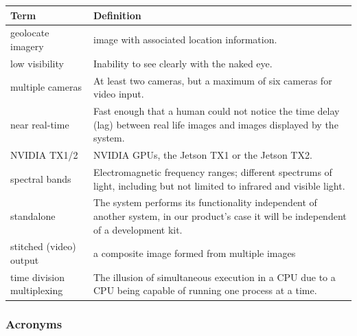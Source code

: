 \documentclass[letterpaper,10pt,serif,draftclsnofoot,onecolumn,compsoc,titlepage]{IEEEtran}
\begin{document}
\begin{tabular}{|l|p{11cm}|}
	\hline
	\textbf{Term} & \textbf{Definition}\\
	\hline
	geolocate imagery & image with associated location information.\\
	\hline
	low visibility & Inability to see clearly with the naked eye.\\
	\hline	
	multiple cameras & At least two cameras, but a maximum of six cameras for 
	video input.\\
	\hline
	near real-time & Fast enough that a human could not notice the time 
	delay (lag) between \newline real life images and images displayed by the system.\\
	\hline
	NVIDIA TX1/2 & NVIDIA GPUs, the Jetson TX1 or the Jetson TX2.\\
	\hline
	spectral bands & Electromagnetic frequency ranges; different 
	spectrums of light, including \newline but not limited to infrared 
	and visible light.\\
	\hline
	standalone & The system performs its functionality independent of another
	system, in our product's case it will be independent of a development kit. \\
	\hline
	stitched (video) output & a composite image formed from multiple images\\
	\hline
	time division multiplexing & The illusion of simultaneous execution in a CPU due
	to a CPU being capable of running one process at a time.\\
	\hline
\end{tabular}

\subsubsection{Acronyms}
\end{document}
